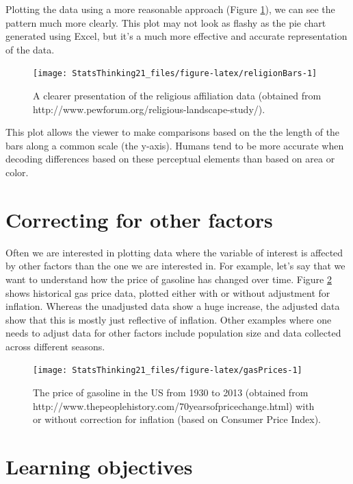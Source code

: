 \documentclass[12pt,]{book}
\theoremstyle{definition}
\theoremstyle{definition}
\theoremstyle{definition}
\theoremstyle{remark}
\begin{document}
Plotting the data using a more reasonable approach (Figure \ref{fig:religionBars}), we can see the pattern much more clearly. This plot may not look as flashy as the pie chart generated using Excel, but it's a much more effective and accurate representation of the data.

\begin{figure}
\texttt{[image: StatsThinking21\_files/figure-latex/religionBars-1]} \caption{A clearer presentation of the religious affiliation data (obtained from http://www.pewforum.org/religious-landscape-study/).}\label{fig:religionBars}
\end{figure}

This plot allows the viewer to make comparisons based on the the length of the bars along a common scale (the y-axis). Humans tend to be more accurate when decoding differences based on these perceptual elements than based on area or color.

\hypertarget{correcting-for-other-factors}{%
\section{Correcting for other factors}\label{correcting-for-other-factors}}

Often we are interested in plotting data where the variable of interest is affected by other factors than the one we are interested in. For example, let's say that we want to understand how the price of gasoline has changed over time. Figure \ref{fig:gasPrices} shows historical gas price data, plotted either with or without adjustment for inflation. Whereas the unadjusted data show a huge increase, the adjusted data show that this is mostly just reflective of inflation. Other examples where one needs to adjust data for other factors include population size and data collected across different seasons.

\begin{figure}
\texttt{[image: StatsThinking21\_files/figure-latex/gasPrices-1]} \caption{The price of gasoline in the US from 1930 to 2013 (obtained from http://www.thepeoplehistory.com/70yearsofpricechange.html) with or without correction for inflation (based on Consumer Price Index).}\label{fig:gasPrices}
\end{figure}

\hypertarget{learning-objectives-3}{%
\section{Learning objectives}\label{learning-objectives-3}}
\end{document}
